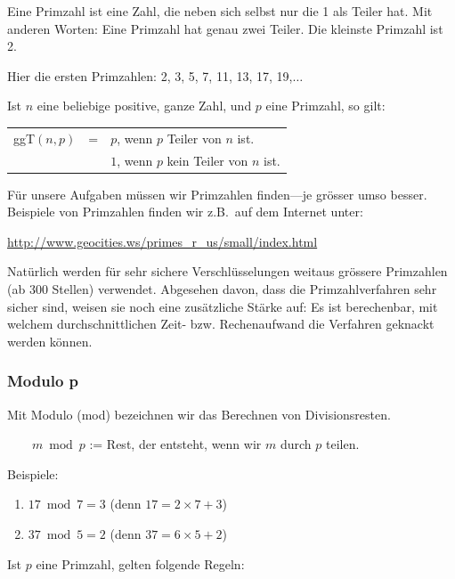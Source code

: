 Eine Primzahl ist eine Zahl, die neben sich selbst nur die 1 als
Teiler hat. Mit anderen Worten: Eine Primzahl hat genau zwei
Teiler. Die kleinste Primzahl ist 2.

\begin{beispiel}[Primzahlen]
    \label{ex:primzahlen}
    Hier die ersten Primzahlen: 2, 3, 5, 7, 11, 13, 17, 19,$\ldots$
\end{beispiel}

\begin{bemerkung}
    Ist $n$ eine beliebige positive, ganze Zahl, und $p$ eine Primzahl, so gilt:
\end{bemerkung}

\begin{tabular}{lcl}
    ggT$(n,p)$ & = & $p$, wenn $p$ Teiler von $n$ ist. \\
    & & $1$, wenn $p$ kein Teiler von $n$ ist.
\end{tabular}

Für unsere Aufgaben müssen wir Primzahlen finden---je grösser umso besser.
Beispiele von Primzahlen finden wir z.B.~auf dem Internet unter:

\href{http://www.geocities.ws/primes_r_us/small/index.html}
{http://www.geocities.ws/primes\_r\_us/small/index.html}

Natürlich werden für sehr sichere Verschlüsselungen weitaus grössere
Primzahlen (ab 300 Stellen) verwendet. Abgesehen davon, dass die
Primzahlverfahren sehr sicher sind, weisen sie noch eine zusätzliche
Stärke auf: Es ist berechenbar, mit welchem durchschnittlichen
Zeit- bzw. Rechenaufwand die Verfahren geknackt werden können.

\subsubsection*{Modulo p}

Mit Modulo (mod) bezeichnen wir das Berechnen von Divisionsresten.

$\qquad m \bmod p$ := Rest, der entsteht, wenn wir $m$ durch $p$ teilen.

Beispiele:
\begin{enumerate}
    \item $17 \bmod 7 = 3$ (denn $17 = 2\times 7 + 3$)
    \item $37 \bmod 5 = 2$ (denn $37 = 6\times 5 + 2$)
\end{enumerate}

\begin{bemerkung}
    Ist $p$ eine Primzahl, gelten folgende Regeln:
\end{bemerkung}


